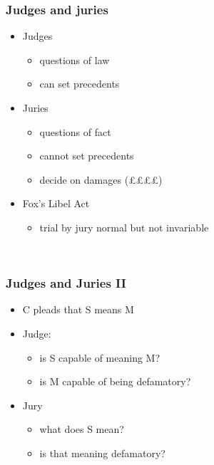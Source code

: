 \documentclass[ignorenonframetext,]{beamer}
\begin{document}
\begin{frame}
\frametitle{Judges and juries}

\begin{itemize}
\item  Judges

  \begin{itemize}
  \item    questions of law
  \item    can set precedents
  \end{itemize}
\item  Juries

  \begin{itemize}
  \item    questions of fact
  \item    cannot set precedents
  \item    decide on damages (££££)
  \end{itemize}
\item  Fox's Libel Act

  \begin{itemize}
  \item    trial by jury normal but not invariable
  \end{itemize}
\end{itemize}

~


\end{frame}

\begin{frame}
\frametitle{Judges and Juries II}

\begin{itemize}
\item  C pleads that S means M
\item  Judge:

  \begin{itemize}
  \item    is S capable of meaning M?
  \item    is M capable of being defamatory?
  \end{itemize}
\item  Jury

  \begin{itemize}
  \item    what does S mean?
  \item    is that meaning defamatory?
  \end{itemize}
\end{itemize}

~


\end{frame}
\end{document}
